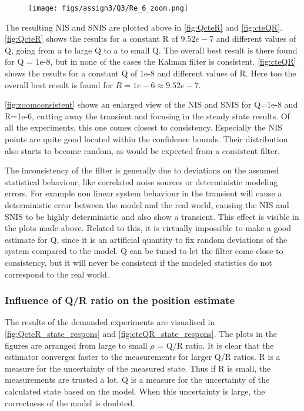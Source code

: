 \documentclass[a4paper]{article}
\newcommand{\newpar}{\vspace{.3cm}\noindent}
\begin{document}
\begin{figure}[H]
    \centering
    \texttt{[image: figs/assign3/Q3/Re\_6\_zoom.png]}
    \label{fig:zoomconsistent}
\end{figure}

\newpar
The resulting NIS and SNIS are plotted above in \autoref{fig:QcteR} and \autoref{fig:cteQR}. \autoref{fig:QcteR} shows the results for a constant R of $9.52e-7$ and different values of Q, going from a to large Q to a to small Q. The overall best result is there found for Q = 1e-8, but in none of the cases the Kalman filter is consistent. \autoref{fig:cteQR} shows the results for a constant Q of 1e-8 and different values of R. Here too the overall best result is found for $R = 1e-6 \approx 9.52e-7$. 

\newpar
\autoref{fig:zoomconsistent} shows an enlarged view of the NIS and SNIS for Q=1e-8 and R=1e-6, cutting away the transient and focusing in the steady state results. Of all the experiments, this one comes closest to consistency. Especially the NIS points are quite good located within the confidence bounds. Their distribution also starts to become random, as would be expected from a consistent filter.

\newpar
The inconsistency of the filter is generally due to deviations on the assumed statistical behaviour, like correlated noise sources or deterministic modeling errors. For example non linear system behaviour in the transient will cause a deterministic error between the model and the real world, causing the NIS and SNIS to be highly deterministic and also show a transient. This effect is visible in the plots made above. Related to this, it is virtually impossible to make a good estimate for Q, since it is an artificial quantity to fix random deviations of the system compared to the model. Q can be tuned to let the filter come close to consistency, but it will never be consistent if the modeled statistics do not correspond to the real world. 


\subsubsection{Influence of Q/R ratio on the position estimate} \label{Q/R ratio position estimate}
The results of the demanded experiments are visualised in \autoref{fig:QcteR_state_respons} and \autoref{fig:cteQR_state_respons}. The plots in the figures are arranged from large to small $\rho$ = Q/R ratio. It is clear that the estimator converges faster to the measurements for larger Q/R ratios. R is a measure for the uncertainty of the measured state. Thus if R is small, the measurements are trusted a lot. Q is a measure for the uncertainty of the calculated state based on the model. When this uncertainty is large, the correctness of the model is doubted. 
\end{document}
